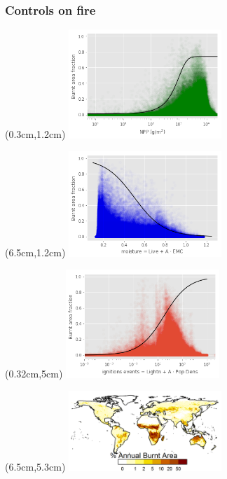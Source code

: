 \begin{frame}
	\frametitle{Controls on fire}
	\begin{textblock*}{14cm}(0.3cm,1.2cm)
		\includegraphics[width=5.78cm]{images/limitCurves/NPPVsFire}	
	\end{textblock*}
	\begin{textblock*}{14cm}(6.5cm,1.2cm)
		\includegraphics[width=5.78cm]{images/limitCurves/alphaVsFire}	
	\end{textblock*}
	\begin{textblock*}{14cm}(0.32cm,5cm)
		\includegraphics[width=5.78cm]{images/limitCurves/ignitionsVsFire.png}		
	\end{textblock*}
	\begin{textblock*}{14cm}(6.5cm,5.3cm)
		\includegraphics[width=5.78cm]{images/limitCurves/fireMap.png}		
	\end{textblock*}
\end{frame}

